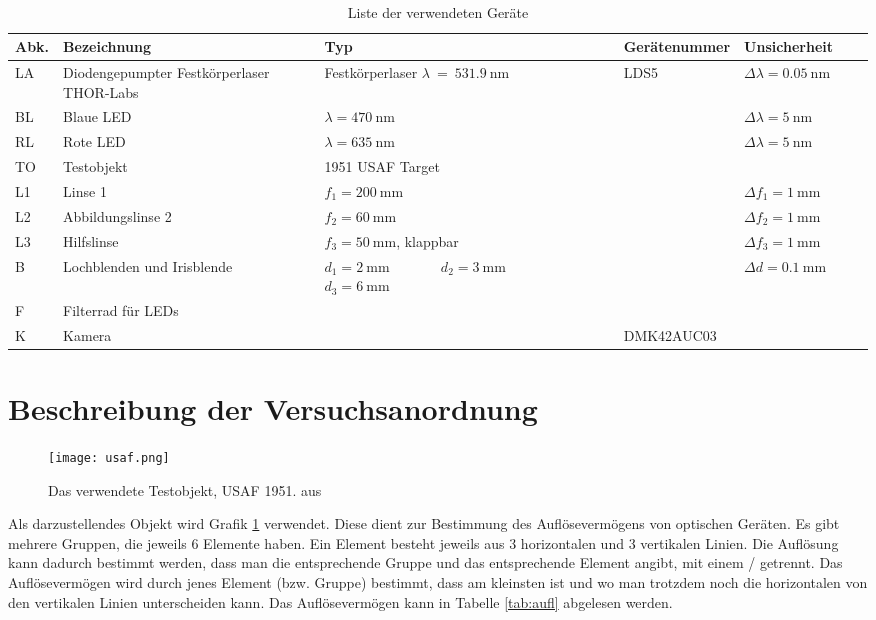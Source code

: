 \documentclass{article}
\begin{document}
\begin{table}[H]
\caption{Liste der verwendeten Geräte}

~

\begin{tabular}{l|p{3cm}p{3cm}llll}
Abk. & Bezeichnung  & Typ & Gerätenummer & Unsicherheit \\
\hline
LA & Diodenge\-pumpter Festkörperlaser THOR-Labs  & Festkörperlaser $\lambda~=~531.9~$nm & LDS5 & $\Delta \lambda = 0.05~$nm \\
\hline
BL & Blaue LED &  $\lambda=470~$nm & & $\Delta \lambda = 5~$nm \\
\hline
RL & Rote LED &  $\lambda=635~$nm & & $\Delta \lambda = 5~$nm \\
\hline
TO & Testobjekt & 1951 USAF Target  \\
\hline
L1 & Linse 1 & $f_1 = 200~$mm & & $\Delta f_1 = 1~$mm \\
\hline
L2 & Abbildungslinse 2 & $f_2= 60~$mm & & $\Delta f_2 = 1~$mm\\
\hline
L3 & Hilfslinse & $f_3 = 50~$mm, klappbar & & $\Delta f_3 = 1~$mm \\
\hline
B & Lochblenden und Irisblende & $d_1=2~$mm ~ ~ ~ ~ $d_2=3~$mm   ~~~~~~~~~~~~ $d_3=6~$mm & &  $\Delta d = 0.1~$mm \\
\hline
F & Filterrad für LEDs & \\
\hline
K & Kamera & & DMK42AUC03
\end{tabular}

\end{table}



\section{Beschreibung der Versuchsanordnung}


\begin{figure}[H]
\caption{Das verwendete Testobjekt, USAF 1951. aus \cite{quelle6}}
\label{fig:usaf}
{\centering
\texttt{[image: usaf.png]}
~
}
\end{figure}


Als darzustellendes Objekt wird Grafik \ref{fig:usaf} verwendet. Diese dient zur Bestimmung des Auflösevermögens von optischen Geräten. Es gibt mehrere Gruppen, die jeweils 6 Elemente haben. Ein Element besteht jeweils aus 3 horizontalen und 3 vertikalen Linien. Die Auflösung kann dadurch bestimmt werden, dass man die entsprechende Gruppe und das entsprechende Element angibt, mit einem / getrennt. Das Auflösevermögen wird durch jenes Element (bzw. Gruppe) bestimmt, dass am kleinsten ist und wo man trotzdem noch die horizontalen von den vertikalen Linien unterscheiden kann. Das Auflösevermögen kann in Tabelle \ref{tab:aufl} abgelesen werden.
\end{document}
